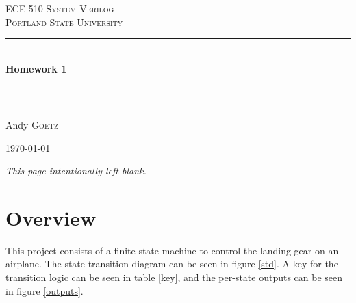 \documentclass{article}
\newcommand{\HRule}{\rule{\linewidth}{0.5mm}}
\begin{document}
\newenvironment{frcseries}{\fontfamily{frc}\selectfont}{}
\newcommand{\textfrc}[1]{{\frcseries#1}}
\newcommand{\mathfrc}[1]{\text{\textfrc{#1}}}



\begin{titlepage}
 
\begin{center}
 
 
\textsc{\LARGE ECE 510 System Verilog}\\[1.5cm]
 
\textsc{\Large Portland State University}\\[0.5cm]
 
 
\HRule \\[0.4cm] { \huge \bfseries Homework 1}\\[0.4cm]
 
\HRule \\[1.5cm]
 
\begin{minipage}{0.4\textwidth}
\begin{center} \large
Andy \textsc{Goetz}\\
\end{center}
\end{minipage}

\vspace{1cm}
 
 
\end{center}
\vfill
\begin{center}
{\large \today}

\end{center} 
\end{titlepage}

\newpage
\thispagestyle{empty}
\vspace*{0.6\paperheight}
\begin{center}\textit{This page intentionally left blank.}\end{center}

\newpage
\setcounter{page}{1}

\section{Overview}
This project consists of a finite state machine to control the landing
gear on an airplane. The state transition diagram can be seen in
figure \ref{std}. A key for the transition logic can be seen in table
\ref{key}, and the per-state outputs can be seen in figure
\ref{outputs}.
\end{document}
